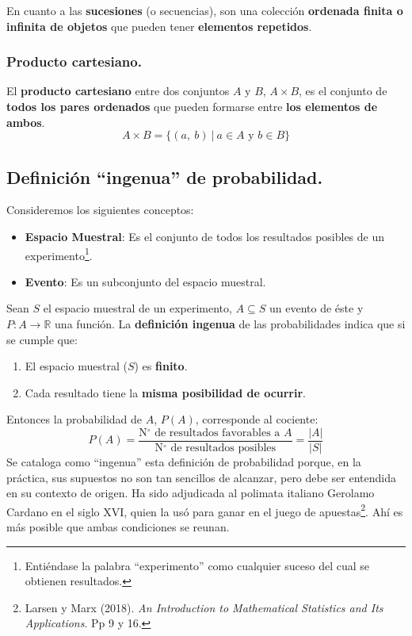 \documentclass[12pt]{article}
\begin{document}
En cuanto a las \textbf{sucesiones} (o secuencias), son una colección \textbf{ordenada finita o infinita de objetos} que pueden tener \textbf{elementos repetidos}.

\subsubsection{Producto cartesiano.}

El \textbf{producto cartesiano} entre dos conjuntos $A$ y $B$, $A \times B$, es el conjunto de \textbf{todos los pares ordenados} que pueden formarse entre \textbf{los elementos de ambos}.
\[
  A \times B = \{(a, \ b) \ | \ a \in A \text{ y } b \in B\}
\]

\subsection{Definición ``ingenua'' de probabilidad.}

Consideremos los siguientes conceptos:

\begin{itemize}
\item \textbf{Espacio Muestral}: Es el conjunto de todos los resultados posibles de un experimento\footnote{Entiéndase la palabra ``experimento'' como cualquier suceso del cual se obtienen resultados.}.

\item \textbf{Evento}: Es un subconjunto del espacio muestral.
\end{itemize}

Sean $S$ el espacio muestral de un experimento, $A \subseteq S$ un evento de éste y $P:A \to \mathbb{R}$ una función. La \textbf{definición ingenua} de las probabilidades indica que si se cumple que:

\begin{enumerate}
\item El espacio muestral ($S$) es \textbf{finito}.
\item Cada resultado tiene la \textbf{misma posibilidad de ocurrir}.
\end{enumerate}

Entonces la probabilidad de $A$, $P(A)$, corresponde al cociente:
\[
  P(A) = \frac{\text{N$^{\circ}$ de resultados favorables a } A}{\text{N$^{\circ}$ de resultados posibles}} = \frac{|A|}{|S|}
\]
Se cataloga como ``ingenua'' esta definición de probabilidad porque, en la práctica, sus supuestos no son tan sencillos de alcanzar, pero debe ser entendida en su contexto de origen. Ha sido adjudicada al polimata italiano Gerolamo Cardano en el siglo XVI, quien la usó para ganar en el juego de apuestas\footnote{Larsen y Marx (2018). \textit{An Introduction to Mathematical Statistics and Its Applications}. Pp 9 y 16.}. Ahí es más posible que ambas condiciones se reunan.
\end{document}
